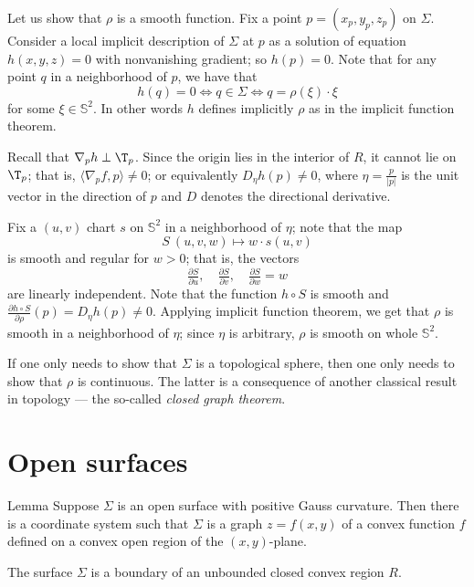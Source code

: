 Let us show that $\rho$ is a smooth function.
Fix a point $p=(x_p,y_p,z_p)$ on $\Sigma$.
Consider a local implicit description of $\Sigma$ at $p$ as a solution of equation $h(x,y,z)=0$ with nonvanishing gradient;
so $h(p)=0$.
Note that for any point $q$ in a neighborhood of $p$, we have that 
\[h(q)=0 \iff q\in \Sigma \iff q=\rho(\xi)\cdot\xi\] for some $\xi\in \mathbb{S}^2$.
In other words $h$ defines implicitly $\rho$ as in the implicit function theorem.



Recall that $\nabla_p h\perp \T_p$.
Since the origin lies in the interior of $R$, it cannot lie on $\T_p$;
that is, $\langle\nabla_p f,p \rangle\ne0$;
or equivalently $D_\eta h(p)\ne 0$, where $\eta=\tfrac{p}{|p|}$ is the unit vector in the direction of $p$ and $D$ denotes the directional derivative.

Fix a $(u,v)$ chart $s$ on $\mathbb{S}^2$ in a neighborhood of $\eta$;
note that the map 
\[S\:(u,v,w)\mapsto w\cdot s(u,v)\] 
is smooth and regular for $w>0$; that is, the vectors 
\[\tfrac{\partial S}{\partial u},\quad \tfrac{\partial S}{\partial v},\quad  \tfrac{\partial S}{\partial w}=w\] are linearly independent.
Note that the function $h\circ S$ is smooth and
$\tfrac{\partial h\circ S}{\partial \rho}(p)=D_\eta h(p)\ne 0$.
Applying implicit function theorem, we get that $\rho$ is smooth in a neighborhood of $\eta$;
since $\eta$ is arbitrary, $\rho$ is smooth on whole $\mathbb{S}^2$.
\qeds


If one only needs to show that $\Sigma$ is a topological sphere, then one only needs to show that $\rho$ is continuous.
The latter is a consequence of another classical result in topology --- the so-called \emph{closed graph theorem}.





\section*{Open surfaces}

\begin{thm}{Lemma}\label{lem:graph}
Suppose $\Sigma$ is an open surface with positive Gauss curvature.
Then there is a coordinate system such that 
$\Sigma$ is a graph $z=f(x,y)$ of a convex function $f$ defined on a convex open region of the $(x,y)$-plane.
\end{thm}

The surface $\Sigma$ is a boundary of an unbounded closed convex region $R$.

